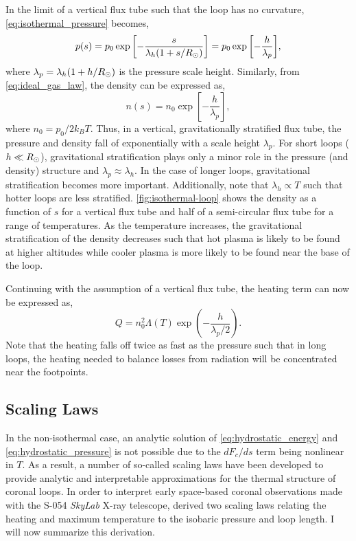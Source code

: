 In the limit of a vertical flux tube such that the loop has no curvature, \autoref{eq:isothermal_pressure} becomes,
\begin{equation}\label{eq:isothermal_pressure_vertical}
    p(s) = p_0\exp{\left[-\frac{s}{\lambda_h(1 + s/R_\odot)}\right]} = p_0\exp{\left[-\frac{h}{\lambda_p}\right]},
\end{equation}
where $\lambda_p=\lambda_h(1 + h/R_\odot)$ is the pressure scale height. Similarly, from \autoref{eq:ideal_gas_law}, the density can be expressed as,
\begin{equation*}
    n(s) = n_0\exp{\left[-\frac{h}{\lambda_p}\right]},
\end{equation*} 
where $n_0=p_0/2k_BT$. Thus, in a vertical, gravitationally stratified flux tube, the pressure and density fall of exponentially with a scale height $\lambda_p$. For short loops ($h\ll R_\odot$), gravitational stratification plays only a minor role in the pressure (and density) structure and $\lambda_p\approx\lambda_h$. In the case of longer loops, gravitational stratification becomes more important. Additionally, note that $\lambda_h\propto T$ such that hotter loops are less stratified. \autoref{fig:isothermal-loop} shows the density as a function of $s$ for a vertical flux tube and half of a semi-circular flux tube for a range of temperatures. As the temperature increases, the gravitational stratification of the density decreases such that hot plasma is likely to be found at higher altitudes while cooler plasma is more likely to be found near the base of the loop.

Continuing with the assumption of a vertical flux tube, the heating term can now be expressed as,
\begin{equation}
    Q = n_0^2 \Lambda(T) \exp{\left(-\frac{h}{\lambda_p/2}\right)}.
\end{equation}
Note that the heating falls off twice as fast as the pressure such that in long loops, the heating needed to balance losses from radiation will be concentrated near the footpoints.

\subsection{Scaling Laws}\label{sec:scaling_laws}


In the non-isothermal case, an analytic solution of \autoref{eq:hydrostatic_energy} and \autoref{eq:hydrostatic_pressure} is not possible due to the $dF_c/ds$ term being nonlinear in $T$. As a result, a number of so-called scaling laws have been developed to provide analytic and interpretable approximations for the thermal structure of coronal loops. In order to interpret early space-based coronal observations made with the S-054 \textit{SkyLab} X-ray telescope, \citet{rosner_dynamics_1978} derived two scaling laws relating the heating and maximum temperature to the isobaric pressure and loop length. I will now summarize this derivation.

